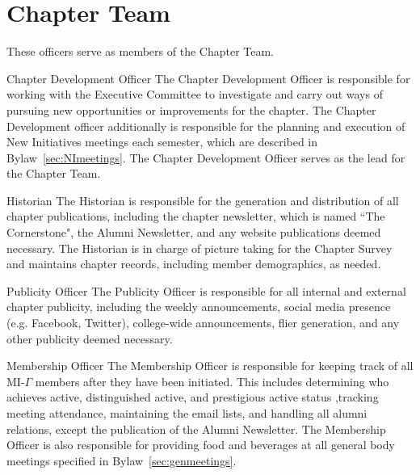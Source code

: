 \section{Chapter Team}\label{sec:ChapterTeam}
These officers serve as members of the Chapter Team.
\begin{enumsubsection}
\item{Chapter Development Officer} The Chapter Development Officer is responsible for working with the Executive Committee to investigate and carry out ways of pursuing new opportunities or improvements for the chapter. The Chapter Development officer additionally is responsible for the planning and execution of New Initiatives meetings each semester, which are described in Bylaw~\ref{sec:NImeetings}. The Chapter Development Officer serves as the lead for the Chapter Team. 

\item{Historian} The Historian is responsible for the generation and distribution of all chapter publications, including the chapter newsletter, which is named ``The Cornerstone", the Alumni Newsletter, and any website publications deemed necessary. The Historian is in charge of picture taking for the Chapter Survey and maintains chapter records, including member demographics, as needed. 

\item{Publicity Officer} The Publicity Officer is responsible for all internal and external chapter publicity, including the weekly announcements, social media presence (e.g. Facebook, Twitter), college-wide announcements, flier generation, and any other publicity deemed necessary.

\item{Membership Officer} The Membership Officer is responsible for keeping track of all MI-$\Gamma$ members after they have been initiated. This includes determining who achieves active,  distinguished active, and prestigious active  status ,tracking meeting attendance, maintaining the email lists, and handling all alumni relations, except the publication of the Alumni Newsletter.  The Membership Officer is also responsible for providing food and beverages at all general body meetings specified in Bylaw~\ref{sec:genmeetings}.
\end{enumsubsection}
%
